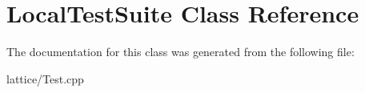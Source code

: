 \hypertarget{class_local_test_suite}{
\section{LocalTestSuite Class Reference}
\label{class_local_test_suite}
}


The documentation for this class was generated from the following file:\begin{DoxyCompactItemize}
\item 
lattice/Test.cpp\end{DoxyCompactItemize}
